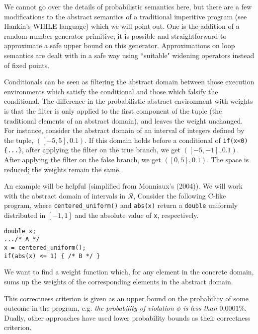 We cannot go over the details of probabilistic semantics here, but there
are a few modifications to the abstract semantics of a
traditional imperitive program (see Hankin's WHILE language) 
which we will point out.
One is the addition of a random number generator primitive; it
is possible and straightforward to approximate a safe upper
bound on this generator.
Approximations on loop semantics are dealt with in a safe way
using ``suitable" widening operators instead of fixed points.

Conditionals can be seen as filtering
the abstract domain between those execution environments which
satisfy the conditional and those which falsify the conditional. 
The difference in the probabilistic abstract environment with weights 
is that the filter is only applied to the first component of
the tuple (the traditional elements of an abstract domain), 
and leaves the weight unchanged.
For instance, consider the abstract domain of an interval of 
integers defined by the tuple, $([-5,5],0.1)$. 
If this domain holds before a conditional of 
{\tt if(x<0)\{...\}}, after applying the filter on the true branch, 
we get $([-5,-1],0.1)$. 
After applying the filter on the false branch, we get $([0,5],0.1)$.
The space is reduced; the weights remain the same.

An example will be helpful (simplified from Monniaux's (2004)).
We will work with the abstract domain of intervals in $\mathcal{R}$,
Consider the following C-like program, where {\tt centered\_uniform()}
and {\tt abs(x)} return a {\tt double} uniformly distributed in 
$[-1,1]$ and the absolute value of {\tt x}, respectively.

{\tt double x;\\
     .../* A */\\
     x = centered\_uniform();\\
     if(abs(x) <= 1) \{ /* B */ \}}

We want to find a weight function which, for any element in the
concrete domain, sums up the weights of the corresponding elements
in the abstract domain.


This correctness criterion is given as an upper bound on the
probability of some outcome in the program, e.g. {\sl the
probability of violation $\phi$ is less than $0.0001\%$}.
Dually, other approaches have
used lower probability bounds as their correctness criterion.

